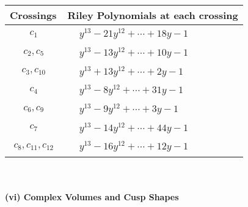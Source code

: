 \documentclass[1p]{elsarticle_modified}
\theoremstyle{definition}
\begin{document}
\begin{tabular}{m{50pt}|m{274pt}}
Crossings & \hspace{64pt}Riley Polynomials at each crossing \\
\hline $$\begin{aligned}c_{1}\end{aligned}$$&$\begin{aligned}
&y^{13}-21 y^{12}+\cdots+18 y-1
\end{aligned}$\\
\hline $$\begin{aligned}c_{2},c_{5}\end{aligned}$$&$\begin{aligned}
&y^{13}-13 y^{12}+\cdots+10 y-1
\end{aligned}$\\
\hline $$\begin{aligned}c_{3},c_{10}\end{aligned}$$&$\begin{aligned}
&y^{13}+13 y^{12}+\cdots+2 y-1
\end{aligned}$\\
\hline $$\begin{aligned}c_{4}\end{aligned}$$&$\begin{aligned}
&y^{13}-8 y^{12}+\cdots+31 y-1
\end{aligned}$\\
\hline $$\begin{aligned}c_{6},c_{9}\end{aligned}$$&$\begin{aligned}
&y^{13}-9 y^{12}+\cdots+3 y-1
\end{aligned}$\\
\hline $$\begin{aligned}c_{7}\end{aligned}$$&$\begin{aligned}
&y^{13}-14 y^{12}+\cdots+44 y-1
\end{aligned}$\\
\hline $$\begin{aligned}c_{8},c_{11},c_{12}\end{aligned}$$&$\begin{aligned}
&y^{13}-16 y^{12}+\cdots+12 y-1
\end{aligned}$\\
\hline
\end{tabular}\\~\\
\newpage\flushleft \textbf{(vi) Complex Volumes and Cusp Shapes}
\end{document}
